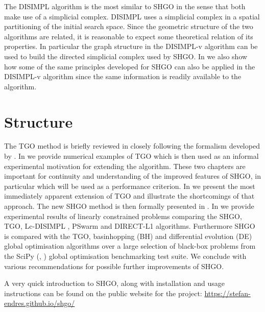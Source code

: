 The DISIMPL algorithm is the most similar to SHGO in the sense that both make use of a simplicial complex. DISIMPL uses a simplicial complex in a  spatial partitioning of the initial search space. Since the geometric structure of the two algorithms are related, it is reasonable to expect some theoretical relation of its properties. In particular the graph structure in the DISIMPL-v algorithm \citep{Paul2016} can be used to build the directed simplicial complex used by SHGO. In  we also show how some of the same principles developed for SHGO can also be applied in the DISIMPL-v algorithm since the same information is readily available to the algorithm.
 
\section{Structure}
The TGO method is briefly reviewed in  closely following the formalism developed by \citet{Henderson2015}. In  we provide numerical examples of TGO which is then used as an informal experimental motivation for extending the algorithm. These two chapters are important for continuity and understanding of the improved features of SHGO, in particular  which will be used as a performance criterion. In  we present the most immediately apparent extension of TGO and illustrate the shortcomings of that approach. The new SHGO method is then formally presented in . In  we provide experimental results of linearly constrained problems comparing the SHGO, TGO, Lc-DISIMPL \citep{Paul2016}, PSwarm \citep{Vaz2008} and DIRECT-L1 \citep{finkel2003direct} algorithms. Furthermore SHGO is compared with the TGO, basinhopping (BH) and differential evolution (DE) global optimisation algorithms over a large selection of black-box problems from the SciPy (\citeauthor*{scipy}, \citeyear{scipy}) global optimisation benchmarking test suite. We conclude with various recommendations for possible further improvements of SHGO.

A very quick introduction to SHGO, along with installation and usage instructions can be found on the public website for the project: \href{https://stefan-endres.github.io/shgo/}{https://stefan-endres.github.io/shgo/}